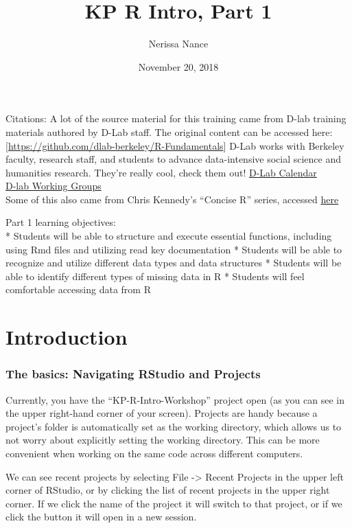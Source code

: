 \documentclass[]{article}
\title{KP R Intro, Part 1}
\author{Nerissa Nance}
\date{November 20, 2018}
\begin{document}
\maketitle

{
\setcounter{tocdepth}{2}
\tableofcontents
}
Citations: A lot of the source material for this training came from
D-lab training materials authored by D-Lab staff. The original content
can be accessed here:
{[}\url{https://github.com/dlab-berkeley/R-Fundamentals}{]} D-Lab works
with Berkeley faculty, research staff, and students to advance
data-intensive social science and humanities research. They're really
cool, check them out!
\href{http://dlab.berkeley.edu/calendar-node-field-date}{D-Lab
Calendar}\\
\href{http://dlab.berkeley.edu/working-groups}{D-lab Working Groups}\\
Some of this also came from Chris Kennedy's ``Concise R'' series,
accessed \href{https://github.com/ck37/concise-r}{here}

Part 1 learning objectives:\\
* Students will be able to structure and execute essential functions,
including using Rmd files and utilizing read key documentation *
Students will be able to recognize and utilize different data types and
data structures * Students will be able to identify different types of
missing data in R * Students will feel comfortable accessing data from R

\section{Introduction}\label{introduction}

\subsubsection{The basics: Navigating RStudio and
Projects}\label{the-basics-navigating-rstudio-and-projects}

Currently, you have the ``KP-R-Intro-Workshop'' project open (as you can
see in the upper right-hand corner of your screen). Projects are handy
because a project's folder is automatically set as the working
directory, which allows us to not worry about explicitly setting the
working directory. This can be more convenient when working on the same
code across different computers.

We can see recent projects by selecting File -\textgreater{} Recent
Projects in the upper left corner of RStudio, or by clicking the list of
recent projects in the upper right corner. If we click the name of the
project it will switch to that project, or if we click the button it
will open in a new session.
\end{document}
